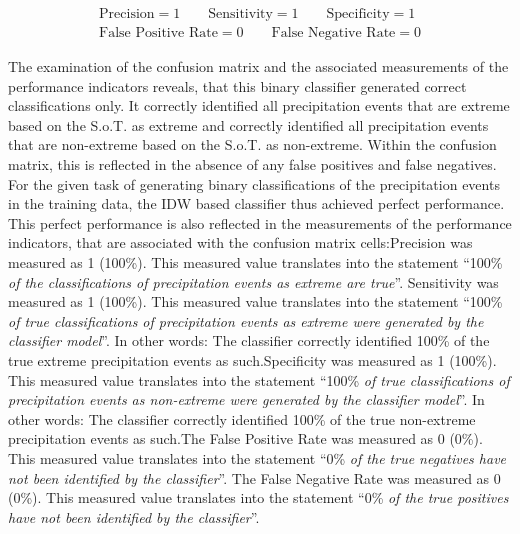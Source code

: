\documentclass[
  12pt,
]{article}
\begin{document}
\vspace{0.75cm}

\begin{mdframed}[leftline = true, rightline = true, bottomline = false, topline = false, frametitle = {Measurements for the classifier performance indicators}]
\setlength{\jot}{3ex}
\begin{equation}
\begin{gathered}
\text{Precision} = 1  \qquad
\text{Sensitivity} = 1  \qquad
\text{Specificity} = 1 \\
\text{False Positive Rate}  = 0\qquad
\text{False Negative Rate} = 0 
\end{gathered}
\end{equation}
\end{mdframed}

The examination of the confusion matrix and the associated measurements
of the performance indicators reveals, that this binary classifier
generated correct classifications only. It correctly identified all
precipitation events that are extreme based on the S.o.T. as extreme and
correctly identified all precipitation events that are non-extreme based
on the S.o.T. as non-extreme. Within the confusion matrix, this is
reflected in the absence of any false positives and false negatives. For
the given task of generating binary classifications of the precipitation
events in the training data, the IDW based classifier thus achieved
perfect performance. This perfect performance is also reflected in the
measurements of the performance indicators, that are associated with the
confusion matrix cells:\newline \textbullet Precision was measured as 1
(100\%). This measured value translates into the statement
\textquotedblleft100\%
\textit{of the classifications of precipitation events as extreme are true}\textquotedblright.\newline
\textbullet Sensitivity was measured as 1 (100\%). This measured value
translates into the statement \textquotedblleft100\%
\textit{of true classifications of precipitation events as extreme were generated by the classifier model}\textquotedblright.
In other words: The classifier correctly identified 100\% of the true
extreme precipitation events as such.\newline \textbullet Specificity
was measured as 1 (100\%). This measured value translates into the
statement \textquotedblleft100\%
\textit{of true classifications of precipitation events as non-extreme were generated by the classifier model}\textquotedblright.
In other words: The classifier correctly identified 100\% of the true
non-extreme precipitation events as such.\newline \textbullet The False
Positive Rate was measured as 0 (0\%). This measured value translates
into the statement \textquotedblleft0\%
\textit{of the true negatives have not been identified by the classifier}\textquotedblright.\newline
\textbullet The False Negative Rate was measured as 0 (0\%). This
measured value translates into the statement \textquotedblleft0\%
\textit{of the true positives have not been identified by the classifier}\textquotedblright.
\end{document}
